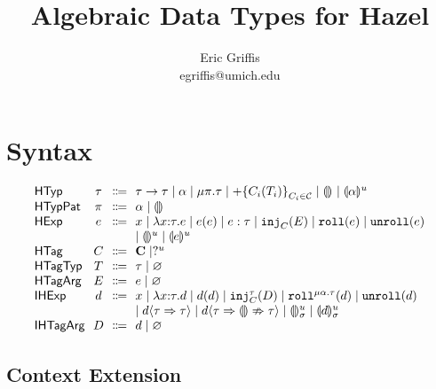 \documentclass{article}
\title{Algebraic Data Types for Hazel}
\author{Eric Griffis \\ egriffis@umich.edu}
\date{}
\let\originalleft\left
\let\originalright\right
\renewcommand{\left}{\mathopen{}\mathclose\bgroup\originalleft}
\renewcommand{\right}{\aftergroup\egroup\originalright}
\newcommand\Sort[1]{\mathsf{#1}}
\newcommand\IHExp{\Sort{IHExp}}
\newcommand\IHTagArg{\Sort{IHTagArg}}
\newcommand\HExp{\Sort{HExp}}
\newcommand\HTag{\Sort{HTag}}
\newcommand\HTagArg{\Sort{HTagArg}}
\newcommand\HTagTyp{\Sort{HTagTyp}}
\newcommand\HTagVar{\Sort{HTagVar}}
\newcommand\HTyp{\Sort{HTyp}}
\newcommand\HTypPat{\Sort{HTypPat}}
\newcommand\hole[2][]{\llparenthesis#1\rrparenthesis^{#2}}
\newcommand\dhole[3][]{\llparenthesis#1\rrparenthesis_{#2}^{#3}}
\newcommand\Tarrow[2]{#1 \rightarrow #2}
\newcommand\Trec[2]{\mu{#1}.{#2}}
\newcommand\Tsum[1]{+\mathopen{}\left\{#1\right\}}
\newcommand\Tag{\mathbf{C}}
\newcommand\TagHole[1]{?^{#1}}
\newcommand\TagSet{\mathcal{C}}
\newcommand\None{\varnothing}
\newcommand\literal[1]{\mathtt{#1}}
\newcommand\asc[2]{{#1}:{#2}}
\newcommand\Efun[3]{\lambda{#1}{:}{#2}.{#3}}
\newcommand\Eapp[2]{{#1}\left({#2}\right)}
\newcommand\Einj[2]{\literal{inj}_{#1}\left({#2}\right)}
\newcommand\Ecase[2]{\literal{case} \left({#1}\right) \left\{{#2}\right\}}
\newcommand\Eroll[1]{\literal{roll}\left(#1\right)}
\newcommand\Eunroll[1]{\literal{unroll}\left(#1\right)}
\newcommand\Dfun[3]{\lambda{#1}{:}{#2}.{#3}}
\newcommand\Dapp[2]{{#1}\left({#2}\right)}
\newcommand\Dinj[3]{\literal{inj}_{#1}^{#2}\left({#3}\right)}
\newcommand\Dcase[2]{\literal{case} \left({#1}\right) \left\{{#2}\right\}}
\newcommand\Droll[3]{\literal{roll}^{\Trec{#1}{#2}}\left({#3}\right)}
\newcommand\Dunroll[1]{\literal{unroll}\left(#1\right)}
\newcommand\cast[3]{{#1}\langle{#2}\Rightarrow{#3}\rangle}
\newcommand\failedcast[3]{{#1}\langle{#2}\Rightarrow{\llparenthesis\rrparenthesis}\nRightarrow{#3}\rangle}
\begin{document}
\maketitle


\section{Syntax}

\[
  \arraycolsep=0pt
  \begin{array}{l@{~~}c@{~~}c@{~~}l}
    \HTyp & \tau & \Coloneqq &
      \Tarrow{\tau}{\tau}
      \mid \alpha
      \mid \Trec{\pi}{\tau}
      \mid \Tsum{C_i(T_i)}_{C_i \in \TagSet}
      \mid \hole{}
      \mid \hole[\alpha]{u}
      \\
    \HTypPat & \pi & \Coloneqq & \alpha \mid \hole{} \\
    \HExp & e & \Coloneqq &
      x
      \mid \Efun{x}{\tau}{e}
      \mid \Eapp{e}{e}
      \mid \asc{e}{\tau}
      \mid \Einj{C}{E}
      \mid \Eroll{e}
      \mid \Eunroll{e}
      \\ & & &
      \mid \hole{u}
      \mid \hole[e]{u}
      \\
    \HTag & C & \Coloneqq &
      \Tag
      \mid \TagHole{u}
      \\
    \HTagTyp & T & \Coloneqq & \tau \mid \None \\
    \HTagArg & E & \Coloneqq & e \mid \None \\
    \IHExp & d & \Coloneqq &
      x
      \mid \Dfun{x}{\tau}{d}
      \mid \Dapp{d}{d}
      \mid \Dinj{C}{\tau}{D}
      \mid \Droll{\alpha}{\tau}{d}
      \mid \Dunroll{d}
      \\ & & &
      \mid \cast{d}{\tau}{\tau}
      \mid \failedcast{d}{\tau}{\tau}
      \mid \dhole{\sigma}{u}
      \mid \dhole[d]{\sigma}{u}
      \\
    \IHTagArg & D & \Coloneqq &
      d
      \mid \None
      \\
  \end{array}
\]


\subsection{Context Extension}
\end{document}
